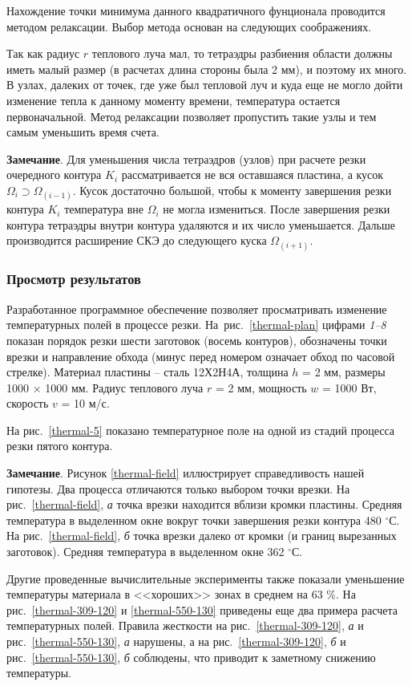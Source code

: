 Нахождение точки минимума данного квадратичного фунционала
проводится методом релаксации.
Выбор метода основан на следующих соображениях.

Так как радиус $r$
теплового луча мал,
то тетраэдры разбиения области должны иметь малый размер
(в расчетах длина стороны была 2 мм),
и поэтому их много.
В узлах, далеких от точек,
где уже был тепловой луч
и куда еще не могло дойти изменение тепла к данному моменту времени,
температура остается первоначальной.
Метод релаксации позволяет пропустить такие узлы
и тем самым уменьшить время счета.

{\bf Замечание}.
Для уменьшения числа тетраэдров (узлов)
при расчете резки очередного контура
$K_i$
рассматривается не вся оставшаяся пластина, а кусок
$\Omega_i \supset \Omega_{(i-1)}$.
Кусок  достаточно большой,
чтобы к моменту завершения резки контура
$K_i$
температура вне
$\Omega_i$
не могла измениться.
После завершения резки контура
тетраэдры внутри контура удаляются и их число уменьшается.
Дальше производится расширение СКЭ до следующего куска
$\Omega_{(i+1)}$.

\subsubsection*{
  Просмотр результатов
}

Разработанное программное обеспечение
позволяет просматривать изменение температурных полей
в процессе резки.
На~рис.~\ref{thermal-plan}
цифрами {\it 1--8}
показан порядок резки
шести заготовок (восемь контуров),
обозначены точки врезки и направление обхода
(минус перед номером означает обход по часовой стрелке).
Материал пластины -- сталь 12Х2Н4А,
толщина $h$ = 2 мм,
размеры 1000 $\times$ 1000 мм.
Радиус теплового луча $r$ = 2 мм,
мощность $w$ = 1000 Вт,
скорость $v$ = 10 м/с.

На рис.~\ref{thermal-5} показано температурное поле
на одной из стадий процесса резки пятого контура.

{\bf Замечание}.
Рисунок \ref{thermal-field}
иллюстрирует справедливость нашей гипотезы.
Два процесса отличаются только выбором точки врезки.
На рис.~\ref{thermal-field}, {\it а}
точка врезки находится вблизи кромки пластины.
Средняя температура в выделенном окне
вокруг точки завершения резки контура 480 $^\circ$С.
На рис.~\ref{thermal-field}, {\it б} точка врезки далеко от кромки
(и границ вырезанных заготовок).
Средняя температура в выделенном окне  362 $^\circ$С.

Другие проведенные вычислительные эксперименты
также показали уменьшение температуры материала
в <<хороших>> зонах в среднем на 63 \%.
На рис.~\ref{thermal-309-120}
и \ref{thermal-550-130}
приведены еще два примера расчета температурных полей.
Правила жесткости на рис.~\ref{thermal-309-120}, {\it а}
и рис.~\ref{thermal-550-130}, {\it а}
нарушены,
а на
рис.~\ref{thermal-309-120}, {\it б}
и рис.~\ref{thermal-550-130}, {\it б}
соблюдены,
что приводит к заметному снижению
температуры.

